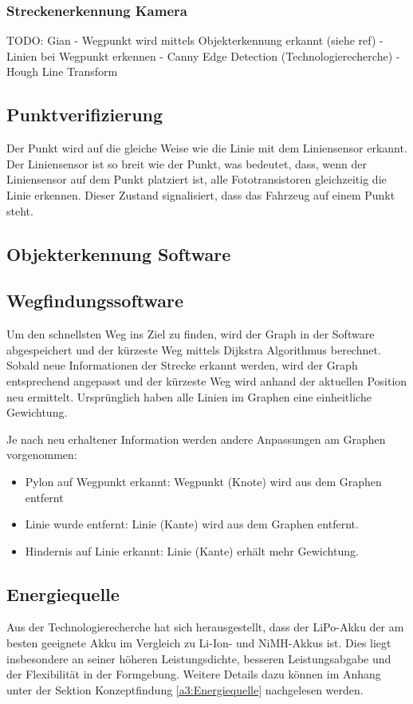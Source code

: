 \documentclass[../main.tex]{subfiles}
\begin{document}
\subsubsection{Streckenerkennung Kamera}

TODO: Gian
- Wegpunkt wird mittels Objekterkennung erkannt (siehe ref)
- Linien bei Wegpunkt erkennen
  - Canny Edge Detection (Technologierecherche)
  - Hough Line Transform



\subsection{Punktverifizierung}
Der Punkt wird auf die gleiche Weise wie die Linie mit dem Liniensensor erkannt. Der Liniensensor ist so breit wie der Punkt, was bedeutet, dass, wenn der Liniensensor auf dem Punkt platziert ist, alle Fototransistoren gleichzeitig die Linie erkennen. Dieser Zustand signalisiert, dass das Fahrzeug auf einem Punkt steht.


\subsection{Objekterkennung Software}




\subsection{Wegfindungssoftware}

Um den schnellsten Weg ins Ziel zu finden, wird der Graph in der Software abgespeichert
und der kürzeste Weg mittels Dijkstra Algorithmus berechnet. Sobald neue Informationen der Strecke erkannt werden, wird der Graph entsprechend angepasst und der kürzeste Weg wird anhand der aktuellen Position neu ermittelt.
Ursprünglich haben alle Linien im Graphen eine einheitliche Gewichtung. 

Je nach neu erhaltener Information werden andere Anpassungen am Graphen vorgenommen:
\begin{itemize}
    \item Pylon auf Wegpunkt erkannt: Wegpunkt (Knote) wird aus dem Graphen entfernt
    \item Linie wurde entfernt: Linie (Kante) wird aus dem Graphen entfernt.
    \item Hindernis auf Linie erkannt: Linie (Kante) erhält mehr Gewichtung.
\end{itemize}

\subsection{Energiequelle}
Aus der Technologierecherche hat sich herausgestellt, dass der LiPo-Akku der am besten geeignete Akku im Vergleich zu Li-Ion- und NiMH-Akkus ist. Dies liegt insbesondere an seiner höheren Leistungsdichte, besseren Leistungsabgabe und der Flexibilität in der Formgebung. Weitere Details dazu können im Anhang unter der Sektion Konzeptfindung \ref{a3:Energiequelle} nachgelesen werden.
\end{document}
